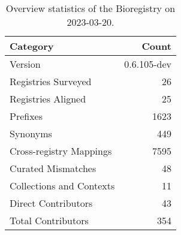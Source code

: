 \begin{table}
\centering
\caption{Overview statistics of the Bioregistry on 2023-03-20.}
\label{tab:bioregistry-summary}
\begin{tabular}{lr}
\toprule
                Category &       Count \\
\midrule
                 Version & 0.6.105-dev \\
     Registries Surveyed &          26 \\
      Registries Aligned &          25 \\
                Prefixes &        1623 \\
                Synonyms &         449 \\
 Cross-registry Mappings &        7595 \\
      Curated Mismatches &          48 \\
Collections and Contexts &          11 \\
     Direct Contributors &          43 \\
      Total Contributors &         354 \\
\bottomrule
\end{tabular}
\end{table}
